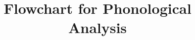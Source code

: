 \documentclass{article}
\title{Flowchart for Phonological Analysis}
\date{}
\begin{document}
  \maketitle
  {\large
    
  }
\end{document}
